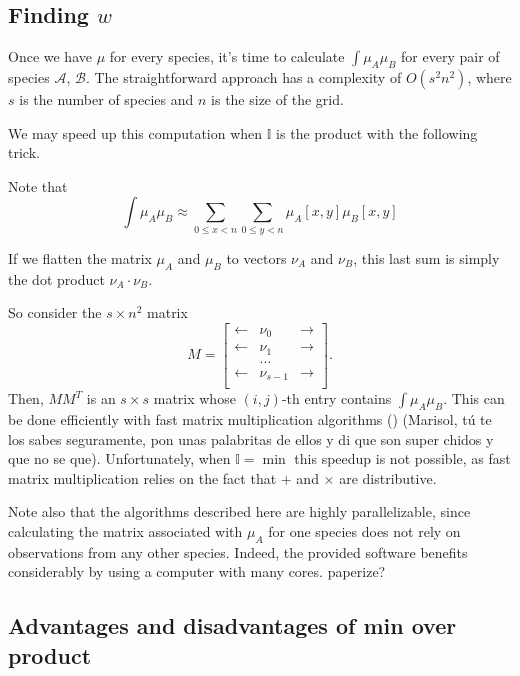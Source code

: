 \documentclass[12pt]{article}
\numberwithin{equation}{section} %
\numberwithin{figure}{section} %
\def\cA{{\mathcal{A}}}
\def\cB{{\mathcal{B}}}
\def\II{{\mathbb{I}}}
\theoremstyle{definition}
\def\tcr#1{\textcolor{MyRed}{#1}}
\begin{document}
	

	\subsection{Finding \texorpdfstring{$w$}{w}}
	
	Once we have $\mu$ for every species, it's time to calculate $\int \mu_A\mu_B$ for every pair of species $\cA$, $\cB$. The straightforward approach has a complexity of $O(s^2n^2)$, where $s$ is the number of species and $n$ is the size of the grid. 
	
	We may speed up this computation when $\II$ is the product with the following trick. 
	
	Note that 
		$$\int \mu_A \mu_B \approx \sum_{0\leq x < n} \sum_{0\leq y < n} \mu_A[x,y]\mu_B[x,y]$$
	
	If we flatten the matrix $\mu_A$ and $\mu_B$ to vectors $\nu_A$ and $\nu_B$, this last sum is simply the dot product $\nu_A\cdot \nu_B$.
	
	So consider the $s\times n^2$ matrix 
	$$M = \begin{bmatrix}
	        \longleftarrow & \nu_0 & \longrightarrow \\
	        \longleftarrow & \nu_1 & \longrightarrow \\
	          & \dots &   \\
					\longleftarrow & \nu_{s-1} & \longrightarrow \\
	      \end{bmatrix}.
	$$
Then, $MM^T$ is an $s\times s$ matrix whose $(i,j)$-th entry contains $\int \mu_A \mu_B$. This can be done efficiently with fast matrix multiplication algorithms (\cite{strassen}) \tcr{(Marisol, tú te los sabes seguramente, pon unas palabritas de ellos y di que son super chidos y que no se que)}. Unfortunately, when $\II = \min$ this speedup is not possible, as fast matrix multiplication relies on the fact that $+$ and $\times$ are distributive.

Note also that the algorithms described here are highly parallelizable, since calculating the matrix associated with $\mu_A$ for one species does not rely on observations from any other species. Indeed, the provided software benefits considerably by using a computer with many cores. \tcr{paperize?}

\subsection{Advantages and disadvantages of min over product}
\end{document}
